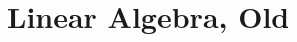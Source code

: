 \documentclass[12pt]{book}
\numberwithin{equation}{section} %
\theoremstyle{plain}
\theoremstyle{definition}
\newtheorem{defn}[thm]{Definition}
\theoremstyle{remark}
\newcommand{\C}{\mathbb{C}}
\begin{document}
\chapter{Linear Algebra, Old}


\clearpage




\end{document}
